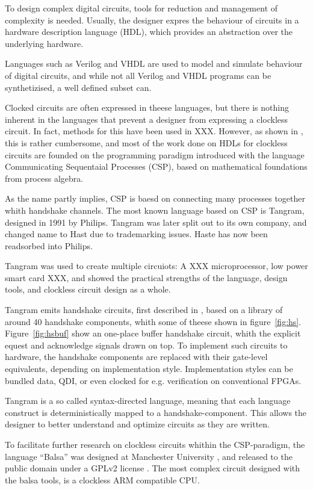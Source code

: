 To design complex digital circuits, tools for reduction and management
of complexity is needed. Usually, the designer expres the behaviour of
circuits in a hardware description language (HDL), which provides an
abstraction over the underlying hardware.

Languages such as Verilog and VHDL are used to model and simulate
behaviour of digital circuits, and while not all Verilog and VHDL
programs can be synthetizised, a well defined subset can.

Clocked circuits are often expressed in theese languages, but there is
nothing inherent in the languages that prevent a designer from
expressing a clockless circuit. In fact, methods for this have been
used in XXX. However, as shown in \cite[pp XXX]{sparsø}, this is
rather cumbersome, and most of the work done on HDLs for clockless
circuits are founded on the programming paradigm introduced with the
language Communicating Sequentaial Processes (CSP)\cite{xxx}, based on
mathematical foundations from process algebra.

As the name partly implies, CSP is baesd on connecting many processes
together whith handshake channels. The most known language based on
CSP is Tangram, designed in 1991 by Philips. Tangram was later split
out to its own company, and changed name to Hast due to trademarking
issues. Haste has now been readsorbed into Philips.

Tangram was used to create multiple circuiots: A XXX microprocessor,
low power smart card XXX, and showed the practical strengths of the
language, design tools,  and clockless circuit design as a
whole.

Tangram emits handshake circuits, first described in
\cite{12,teakxxx}, based on a library of around 40 handshake
components, whith some of theese shown in
figure~\ref{fig:hs}. Figure~\ref{fig:hsbuf} show an one-place buffer
handshake circuit, whith the explicit equest and acknowledge signals
drawn on top. To implement such circuits to hardware, the handshake
components are replaced with their gate-level equivalents, depending
on implementation style. Implementation styles can be bundled data,
QDI, or even clocked for e.g. verification on conventional FPGAs.

Tangram is a so called syntax-directed language, meaning that each
language construct is deterministically mapped to a
handshake-component. This allows the designer to better understand and
optimize circuits as they are written.

To facilitate further research on clockless circuits whithin the
CSP-paradigm, the language ``Balsa'' was designed at Manchester
University \cite{xxx}, and released to the public domain under a GPLv2
license \cite{gpl}. The most complex circuit designed with the balsa
tools, is a clockless ARM\cite{arm} compatible CPU\cite{spa}.

